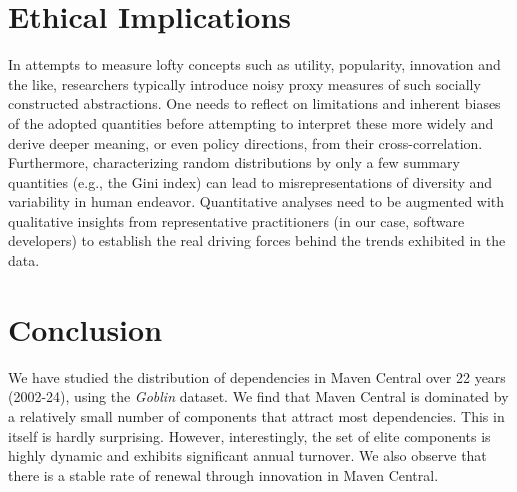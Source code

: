 \documentclass[10pt,conference]{IEEEtran}
\begin{document}
\section{Ethical Implications}
\label{section:ethics}

In attempts to measure lofty concepts such as utility,
popularity, innovation and the like, researchers typically
introduce noisy proxy measures of such socially constructed
abstractions. One needs to reflect on limitations and inherent
biases of the adopted quantities before attempting to interpret
these more widely and derive deeper meaning, or even policy
directions, from their cross-correlation. Furthermore,
characterizing random distributions by only a few summary
quantities (e.g., the Gini index) can lead to misrepresentations
of diversity and variability in human endeavor. Quantitative
analyses need to be augmented with qualitative insights from
representative practitioners (in our case, software developers)
to establish the real driving forces behind the trends exhibited
in the data.

\section{Conclusion}
\label{section:conclusion}

We have studied the distribution of dependencies in Maven Central over 22 years (2002-24), using the \textit{Goblin} dataset. We find that Maven Central is dominated by a relatively small number of components that attract most dependencies. This in itself is hardly surprising. However, interestingly, the set of elite components is highly dynamic and exhibits significant annual turnover. We also observe that there is a stable rate of renewal through innovation in Maven Central.
\end{document}
